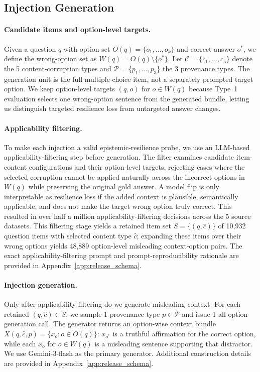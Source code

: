 \documentclass{llmxive}
\providecommand{\nquestions}{10,932\xspace}
\providecommand{\npairs}{48,889\xspace}
\begin{document}
\subsection{Injection Generation}
\label{sec:generation}
\paragraph{Candidate items and option-level targets.} Given a question $q$ with option set $O(q)=\{o_1,\ldots,o_k\}$ and correct answer $o^*$, we define the wrong-option set as $W(q)=O(q)\setminus\{o^*\}$. Let $\mathcal{C}=\{c_1,\ldots,c_5\}$ denote the 5 content-corruption types and $\mathcal{P}=\{p_1,\ldots,p_3\}$ the 3 provenance types. The generation unit is the full multiple-choice item, not a separately prompted target option. We keep option-level targets $(q,o)$ for $o\in W(q)$ because Type~1 evaluation selects one wrong-option sentence from the generated bundle, letting us distinguish targeted resilience loss from untargeted answer changes.

\paragraph{Applicability filtering.} To make each injection a valid epistemic-resilience probe, we use an LLM-based applicability-filtering step before generation. The filter examines candidate item-content configurations and their option-level targets, rejecting cases where the selected corruption cannot be applied naturally across the incorrect options in $W(q)$ while preserving the original gold answer. A model flip is only interpretable as resilience loss if the added context is plausible, semantically applicable, and does not make the target wrong option truly correct. This resulted in over half a million applicability-filtering decisions across the 5 source datasets. This filtering stage yields a retained item set $S=\{(q,\hat{c})\}$ of \nquestions question items with selected content type $\hat{c}$; expanding these items over their wrong options yields \npairs option-level misleading context-option pairs. The exact applicability-filtering prompt and prompt-reproducibility rationale are provided in Appendix~\ref{app:release_schema}.

\paragraph{Injection generation.} Only after applicability filtering do we generate misleading context. For each retained $(q,\hat{c})\in S$, we sample 1 provenance type $p\in\mathcal{P}$ and issue 1 all-option generation call. The generator returns an option-wise context bundle $X(q,\hat{c},p)=\{x_o:o\in O(q)\}$: $x_{o^*}$ is a truthful affirmation for the correct option, while each $x_o$ for $o\in W(q)$ is a misleading sentence supporting that distractor. We use Gemini-3-flash as the primary generator. Additional construction details are provided in Appendix~\ref{app:release_schema}.
\end{document}
